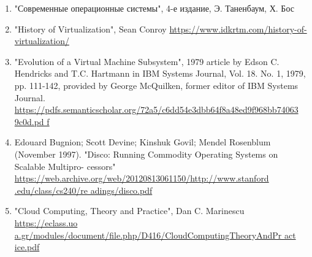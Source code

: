 \documentclass[14pt, a4paper]{article}
\begin{document}
\begin{enumerate}
\item "Современные операционные системы", 4-е издание, Э. Таненбаум, Х. Бос
\item "History of Virtualization", Sean Conroy \href{https://www.idkrtm.com/history-of-virtualization/}{https://www.idkrtm.com/history-of-virtualization/}
\item "Evolution of a Virtual Machine Subsystem", 1979 article by Edson C. Hendricks and
T.C. Hartmann in IBM Systems Journal, Vol. 18. No. 1, 1979, pp. 111-142, provided
by George McQuilken, former editor of IBM Systems Journal. \href{https://pdfs.semanticscholar.org/72a5/c6dd54e3dbb64f8a48ed9f968bb740639c0d.pd
f}{https://pdfs.semanticscholar.org/72a5/c6dd54e3dbb64f8a48ed9f968bb74063\\9c0d.pd
f}
\item Edouard Bugnion; Scott Devine; Kinshuk Govil; Mendel Rosenblum (November
1997). "Disco: Running Commodity Operating Systems on Scalable Multipro- cessors" 
 \href{https://web.archive.org/web/20120813061150/http://www.stanford.edu/class/cs240/re
adings/disco.pdf}{https://web.archive.org/web/20120813061150/http://www.stanford\\.edu/class/cs240/re
adings/disco.pdf}
\item "Cloud Computing, Theory and Practice", Dan C. Marinescu \href{https://eclass.uoa.gr/modules/document/file.php/D416/CloudComputingTheoryAndPr
actice.pdf}{https://eclass.uo\\a.gr/modules/document/file.php/D416/CloudComputingTheoryAndPr
act\\ice.pdf}
\end{enumerate}
\end{document}
